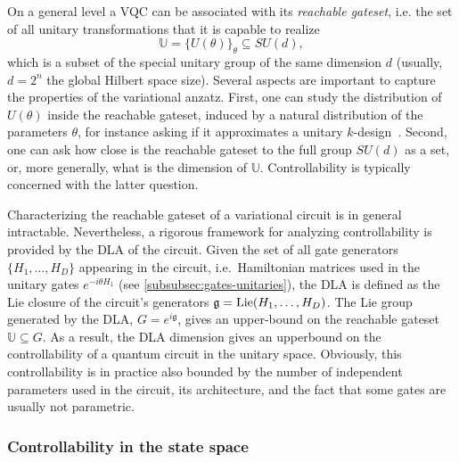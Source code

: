 \documentclass[aps,10pt,groupedaddress,prx,superscriptaddress,twocolumn,balancelastpage, tightenlines]{revtex4-2}
\theoremstyle{plain}  %
\begin{document}
On a general level a \gls{VQC} can be associated with its {\it reachable gateset}, i.e. the set of all unitary transformations that it is capable to realize
\begin{equation}
    \mathbb{U}=\{U(\theta)\}_\theta \subseteq SU(d),
\end{equation}
which is a subset of the special unitary group of the same dimension $d$ (usually, $d=2^n$ the global Hilbert space size). Several aspects are important to capture the properties of the variational anzatz. First, one can study the distribution of $U(\theta)$ inside the reachable gateset, induced by a natural distribution of the parameters $\theta$, for instance asking if it approximates a unitary $k$-design~\cite{holmes_connecting_2022}. Second, one can ask how close is the reachable gateset to the full group $SU(d)$ as a set, or, more generally, what is the dimension of $\mathbb{U}$. Controllability is typically concerned with the latter question.


Characterizing the reachable gateset of a variational circuit is in general intractable. Nevertheless,
a rigorous framework for analyzing controllability is provided by the \gls{DLA} of the circuit. Given the set of all gate generators $\{H_1, \dots, H_D\}$ appearing in the circuit, i.e.~Hamiltonian matrices used in the unitary gates $e^{-i \theta H_1}$ (see \autoref{subsubsec:gates-unitaries}), the DLA is defined as the Lie closure of the circuit’s generators $\mathfrak{g} ={\rm Lie}( H_1, \dots, H_D )$. The Lie group generated by the DLA, $G=e^{i\mathfrak{g}}$, gives an upper-bound on the reachable gateset $\mathbb{U}\subseteq G$.
As a result, the DLA dimension gives an upperbound on the controllability of a quantum circuit in the unitary space. Obviously, this controllability is in practice also bounded by the number of independent parameters used in the circuit, its architecture, and the fact that some gates are usually not parametric.


\subsubsection{Controllability in the state space}
\end{document}
